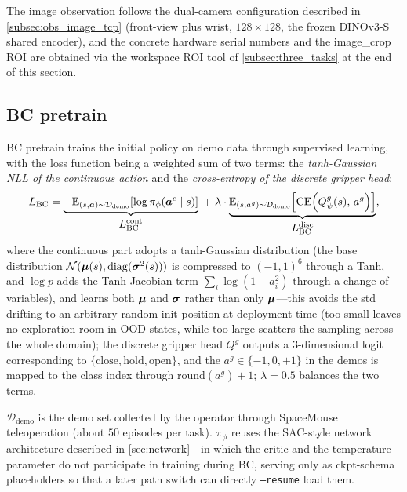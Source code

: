 The image observation follows the dual-camera configuration described in \cref{subsec:obs_image_tcp} (front-view plus wrist, $128 \times 128$, the frozen DINOv3-S shared encoder), and the concrete hardware serial numbers and the image\_crop ROI are obtained via the workspace ROI tool of \cref{subsec:three_tasks} at the end of this section.

\subsection{BC pretrain}\label{subsec:bc_pretrain}

BC pretrain trains the initial policy on demo data through supervised learning, with the loss function being a weighted sum of two terms: the \emph{tanh-Gaussian NLL of the continuous action} and the \emph{cross-entropy of the discrete gripper head}:
\begin{equation*}
  L_\text{BC} = \underbrace{-\mathbb{E}_{(s, \bm{a})\sim\mathcal{D}_\text{demo}}\!\left[\log \pi_\phi(\bm{a}^c\mid s)\right]}_{\textstyle L_\text{BC}^\text{cont}}
  \;+\; \lambda \cdot
  \underbrace{\mathbb{E}_{(s, a^g)\sim\mathcal{D}_\text{demo}}\!\left[\mathrm{CE}\!\left(Q^g_\psi(s),\, a^g\right)\right]}_{\textstyle L_\text{BC}^\text{disc}},
\end{equation*}
where the continuous part adopts a tanh-Gaussian distribution (the base distribution $\mathcal{N}(\bm{\mu}(s), \mathrm{diag}(\bm{\sigma}^2(s)))$ is compressed to $(-1, 1)^6$ through a Tanh, and $\log p$ adds the Tanh Jacobian term $\sum_i \log(1 - a_i^2)$ through a change of variables), and learns both $\bm{\mu}$ and $\bm{\sigma}$ rather than only $\bm{\mu}$---this avoids the std drifting to an arbitrary random-init position at deployment time (too small leaves no exploration room in OOD states, while too large scatters the sampling across the whole domain); the discrete gripper head $Q^g$ outputs a $3$-dimensional logit corresponding to $\{\text{close}, \text{hold}, \text{open}\}$, and the $a^g \in \{-1, 0, +1\}$ in the demos is mapped to the class index through $\mathrm{round}(a^g)+1$; $\lambda = 0.5$ balances the two terms.

$\mathcal{D}_\text{demo}$ is the demo set collected by the operator through SpaceMouse teleoperation (about $50$ episodes per task). $\pi_\phi$ reuses the SAC-style network architecture described in \cref{sec:network}---in which the critic and the temperature parameter do not participate in training during BC, serving only as ckpt-schema placeholders so that a later path switch can directly \texttt{--resume} load them.

